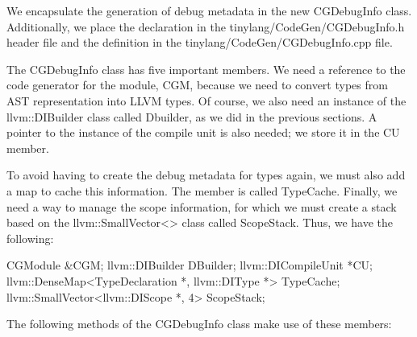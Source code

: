 
We encapsulate the generation of debug metadata in the new CGDebugInfo class. Additionally, we place the declaration in the tinylang/CodeGen/CGDebugInfo.h header file and the definition in the tinylang/CodeGen/CGDebugInfo.cpp file.

The CGDebugInfo class has five important members. We need a reference to the code generator for the module, CGM, because we need to convert types from AST representation into LLVM types. Of course, we also need an instance of the llvm::DIBuilder class called Dbuilder, as we did in the previous sections. A pointer to the instance of the compile unit is also needed; we store it in the CU member.

To avoid having to create the debug metadata for types again, we must also add a map to cache this information. The member is called TypeCache. Finally, we need a way to manage the scope information, for which we must create a stack based on the llvm::SmallVector<> class called ScopeStack. Thus, we have the following:

\begin{cpp}
CGModule &CGM;
llvm::DIBuilder DBuilder;
llvm::DICompileUnit *CU;
llvm::DenseMap<TypeDeclaration *, llvm::DIType *>
    TypeCache;
llvm::SmallVector<llvm::DIScope *, 4> ScopeStack;
\end{cpp}

The following methods of the CGDebugInfo class make use of these members:


